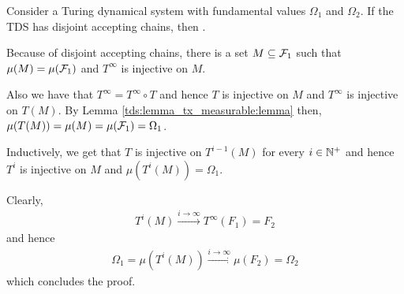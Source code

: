 \begin{Lemma}
	\label{tds:lemma_disj_acc_ch:lemma}
	Consider a Turing dynamical system with fundamental values $\Omega_1$ and $\Omega_2$.
	If the TDS has disjoint accepting chains, then .
\end{Lemma}

\proof

	Because of disjoint accepting chains, there is a set $M \subseteq \mathcal{F}_1$ such that $\mu(M) = \mu(\mathcal{F}_1)$ and $T^\infty$ is injective on $M$.

	Also we have that $T^\infty = T^\infty \circ T$ and hence $T$ is injective on $M$ and $T^\infty$ is injective on $T(M)$.
	By Lemma \ref{tds:lemma_tx_measurable:lemma} then, $\mu(T(M)) = \mu(M) = \mu(\mathcal{F}_1) = \Omega_1$.

	Inductively, we get that $T$ is injective on $T^{i-1}(M)$ for every $i \in \mathbb{N}^+$ and hence $T^i$ is injective on $M$ and $\mu(T^i(M)) = \Omega_1$.

	Clearly, 
	\begin{align*}
		T^i(M) \xrightarrow{i \to \infty} T^\infty(F_1) = F_2
	\end{align*}
	 and hence
	\begin{align*}
		\Omega_1 = \mu(T^i(M)) \xrightarrow{i \to \infty} \mu(F_2) = \Omega_2
	\end{align*}
	which concludes the proof.

\endproof

